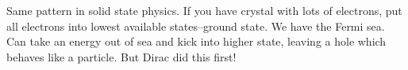 \documentclass[]{article}
\begin{document}
Same pattern in solid state physics. If you have crystal with lots of electrons, put all electrons into lowest available states--ground state. We have the Fermi sea. Can take an energy out of sea and kick into higher state, leaving a hole which behaves like a particle. But Dirac did this first!


\raggedright

\end{document}
